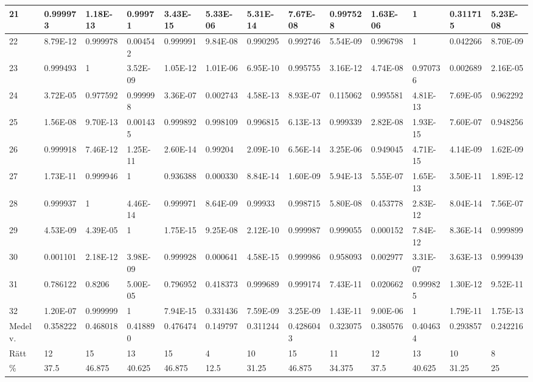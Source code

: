 \documentclass[a4paper,10pt]{article}
\begin{document}
\begin{centering}
{\begin{tabular}{ |l|l|l|l|l|l|l|l|l|l|l|l|l| }
21	       & 0.999973 & 1.18E-13 & 0.99971  & 3.43E-15 & 5.33E-06 & 5.31E-14 &  7.67E-08 & 0.997528  & 1.63E-06 &  1        & 0.311715 & 5.23E-08 \\ \hline      
22	       & 8.79E-12 & 0.999978 & 0.004542 & 0.999991 & 9.84E-08 & 0.990295 &  0.992746 & 5.54E-09  & 0.996798 &  1        & 0.042266 & 8.70E-09 \\ \hline       
23	       & 0.999493 & 1        & 3.52E-09 & 1.05E-12 & 1.01E-06 & 6.95E-10 &  0.995755 & 3.16E-12  & 4.74E-08 &  0.970736 & 0.002689 & 2.16E-05 \\ \hline               
24	       & 3.72E-05 & 0.977592 & 0.999998 & 3.36E-07 & 0.002743 & 4.58E-13 &  8.93E-07 & 0.115062  & 0.995581 &  4.81E-13 & 7.69E-05 & 0.962292 \\ \hline             
25	       & 1.56E-08 & 9.70E-13 & 0.001435 & 0.999892 & 0.998109 & 0.996815 &  6.13E-13 & 0.999339  & 2.82E-08 &  1.93E-15 & 7.60E-07 & 0.948256 \\ \hline             
26	       & 0.999918 & 7.46E-12 & 1.25E-11 & 2.60E-14 & 0.99204  & 2.09E-10 &  6.56E-14 & 3.25E-06  & 0.949045 &  4.71E-15 & 4.14E-09 & 1.62E-09 \\ \hline            
27	       & 1.73E-11 & 0.999946 & 1        & 0.936388 & 0.000330 & 8.84E-14 &  1.60E-09 & 5.94E-13  & 5.55E-07 &  1.65E-13 & 3.50E-11 & 1.89E-12 \\ \hline             
28	       & 0.999937 & 1        & 4.46E-14 & 0.999971 & 8.64E-09 & 0.99933  &  0.998715 & 5.80E-08  & 0.453778 &  2.83E-12 & 8.04E-14 & 7.56E-07 \\ \hline            
29	       & 4.53E-09 & 4.39E-05 & 1        & 1.75E-15 & 9.25E-08 & 2.12E-10 &  0.999987 & 0.999055  & 0.000152 &  7.84E-12 & 8.36E-14 & 0.999899 \\ \hline                
30	       & 0.001101 & 2.18E-12 & 3.98E-09 & 0.999928 & 0.000641 & 4.58E-15 &  0.999986 & 0.958093  & 0.002977 &  3.31E-07 & 3.63E-13 & 0.999439 \\ \hline               
31	       & 0.786122 & 0.8206   & 5.00E-05 & 0.796952 & 0.418373 & 0.999689 &  0.999174 & 7.43E-11  & 0.020662 &  0.999825 & 1.30E-12 & 9.52E-11 \\ \hline             
32	       & 1.20E-07 & 0.999999 & 1        & 7.94E-15 & 0.331436 & 7.59E-09 &  3.25E-09 & 1.43E-11  & 9.00E-06 &  1        & 1.79E-11 & 1.75E-13 \\ \hline\hline      
Medelv.    & 0.358222 & 0.468018 & 0.418890 & 0.476474 & 0.149797 & 0.311244 & 0.4286043 & 0.323075  & 0.380576 &  0.404634 & 0.293857 & 0.242216 \\ \hline  
Rätt & 12       & 15       & 13       & 15       & 4        & 10        	 &  15   & 11        & 12       & 13        & 10       & 8 \\ \hline
\%		   & 37.5     & 46.875   & 40.625   & 46.875   & 12.5     & 31.25    & 46.875    & 34.375    & 37.5     & 40.625    & 31.25    & 25 \\ \hline
\end{tabular}

}
\end{centering}
\end{document}
